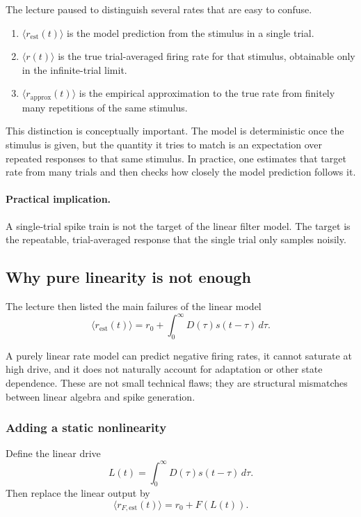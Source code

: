 The lecture paused to distinguish several rates that are easy to confuse.

\begin{enumerate}
    \item $\langle r_{\mathrm{est}}(t)\rangle$ is the model prediction from the stimulus in a single trial.
    \item $\langle r(t)\rangle$ is the true trial-averaged firing rate for that stimulus, obtainable only in the infinite-trial limit.
    \item $\langle r_{\mathrm{approx}}(t)\rangle$ is the empirical approximation to the true rate from finitely many repetitions of the same stimulus.
\end{enumerate}

This distinction is conceptually important. The model is deterministic once the stimulus is given, but the quantity it tries to match is an expectation over repeated responses to that same stimulus. In practice, one estimates that target rate from many trials and then checks how closely the model prediction follows it.

\paragraph{Practical implication.}
A single-trial spike train is not the target of the linear filter model. The target is the repeatable, trial-averaged response that the single trial only samples noisily.

\subsection{Why pure linearity is not enough}

The lecture then listed the main failures of the linear model
\[
\langle r_{\mathrm{est}}(t)\rangle = r_0 + \int_0^{\infty} D(\tau)s(t-\tau)\,d\tau.
\]

A purely linear rate model can predict negative firing rates, it cannot saturate at high drive, and it does not naturally account for adaptation or other state dependence. These are not small technical flaws; they are structural mismatches between linear algebra and spike generation.

\subsubsection{Adding a static nonlinearity}

Define the linear drive
\[
L(t)=\int_0^{\infty} D(\tau)s(t-\tau)\,d\tau.
\]
Then replace the linear output by
\[
\langle r_{F,\mathrm{est}}(t)\rangle = r_0 + F(L(t)).
\]

